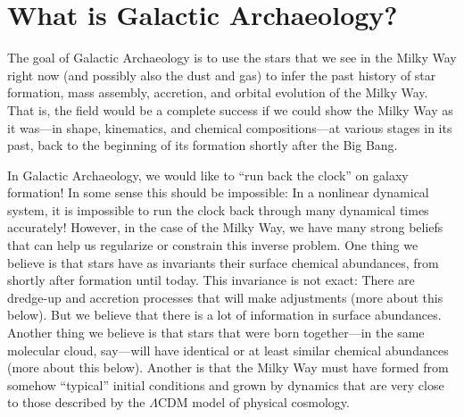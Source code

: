 \documentclass[11pt, letterpaper]{article}
\begin{document}
\section{What is Galactic Archaeology?}

The goal of Galactic Archaeology is to
use the stars that we see in the Milky Way right now (and possibly
also the dust and gas) to infer the past history of star formation,
mass assembly, accretion, and orbital evolution of the Milky Way. That
is, the field would be a complete success if we could show the Milky
Way as it was---in shape, kinematics, and chemical compositions---at
various stages in its past, back to the beginning of its formation
shortly after the Big Bang.

In Galactic Archaeology, we would like to ``run back the clock'' on
galaxy formation! In some sense this should be impossible: In a
nonlinear dynamical system, it is impossible to run the clock back
through many dynamical times accurately! However, in the case of the
Milky Way, we have many strong beliefs that can help us regularize or
constrain this inverse problem. One thing we believe is that stars
have as invariants their surface chemical abundances, from shortly
after formation until today. This invariance is not exact: There are
dredge-up and accretion processes that will make adjustments (more
about this below). But we believe that there is a lot of information
in surface abundances. Another thing we believe is that stars that
were born together---in the same molecular cloud, say---will have
identical or at least similar chemical abundances (more about this
below). Another is that the Milky Way must have formed from somehow
``typical'' initial conditions and grown by dynamics that are very
close to those described by the $\Lambda$CDM model of physical
cosmology.
\end{document}
